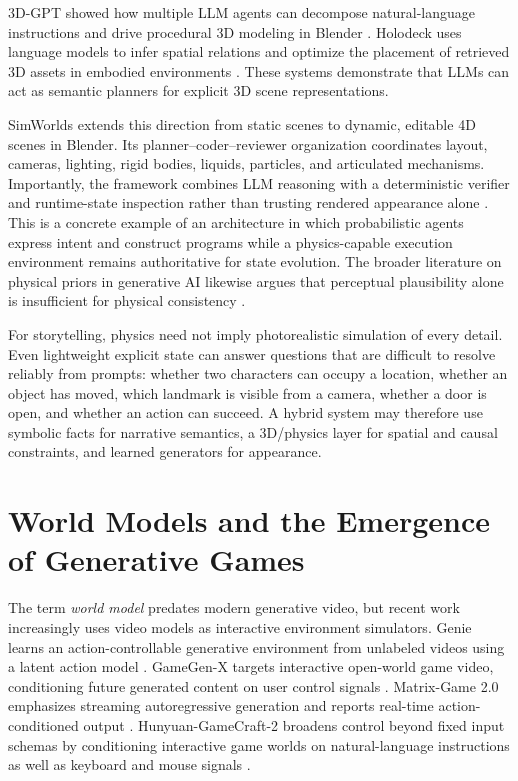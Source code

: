 \documentclass{article}
\begin{document}
3D-GPT showed how multiple LLM agents can decompose natural-language instructions and drive procedural 3D modeling in Blender \citep{sun2023threedgpt}. Holodeck uses language models to infer spatial relations and optimize the placement of retrieved 3D assets in embodied environments \citep{yang2023holodeck}. These systems demonstrate that LLMs can act as semantic planners for explicit 3D scene representations.

SimWorlds extends this direction from static scenes to dynamic, editable 4D scenes in Blender. Its planner--coder--reviewer organization coordinates layout, cameras, lighting, rigid bodies, liquids, particles, and articulated mechanisms. Importantly, the framework combines LLM reasoning with a deterministic verifier and runtime-state inspection rather than trusting rendered appearance alone \citep{liu2026simworlds}. This is a concrete example of an architecture in which probabilistic agents express intent and construct programs while a physics-capable execution environment remains authoritative for state evolution. The broader literature on physical priors in generative AI likewise argues that perceptual plausibility alone is insufficient for physical consistency \citep{meng2025physicalpriors}.

For storytelling, physics need not imply photorealistic simulation of every detail. Even lightweight explicit state can answer questions that are difficult to resolve reliably from prompts: whether two characters can occupy a location, whether an object has moved, which landmark is visible from a camera, whether a door is open, and whether an action can succeed. A hybrid system may therefore use symbolic facts for narrative semantics, a 3D/physics layer for spatial and causal constraints, and learned generators for appearance.

\section{World Models and the Emergence of Generative Games}

The term \emph{world model} predates modern generative video, but recent work increasingly uses video models as interactive environment simulators. Genie learns an action-controllable generative environment from unlabeled videos using a latent action model \citep{bruce2024genie}. GameGen-X targets interactive open-world game video, conditioning future generated content on user control signals \citep{che2024gamegenx}. Matrix-Game 2.0 emphasizes streaming autoregressive generation and reports real-time action-conditioned output \citep{he2025matrixgame}. Hunyuan-GameCraft-2 broadens control beyond fixed input schemas by conditioning interactive game worlds on natural-language instructions as well as keyboard and mouse signals \citep{tang2025hunyungamecraft2}.
\end{document}
